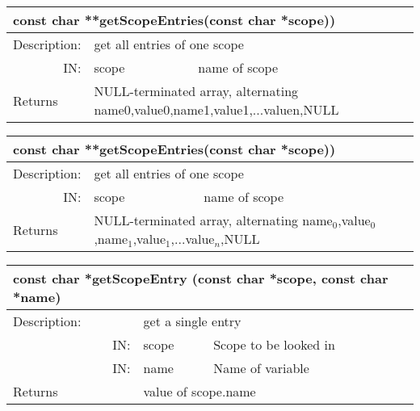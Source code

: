 \begin{htmlonly}  
\begin{longtable}{|p{4cm}|p{2.5cm}|p{7cm}|}
\hline
\multicolumn{3}{|p{13.5cm}|}{\bf const char **getScopeEntries(const char *scope))} \\
\hline
{Description:}   
              & \multicolumn{2}{|p{9.5cm}|}{get all entries of one scope} \\                     
\hline
\multicolumn{1}{|r|}{IN:} & {scope} 
                             & {name of scope}\\
\hline
{Returns}  
    & \multicolumn{2}{|p{9.5cm}|}{NULL-terminated array, alternating\newline
                                 name0,value0,name1,value1,...valuen,NULL} \endhead
\hline
\end{longtable}  
\end{htmlonly}

\latexonly  
\begin{longtable}{|p{4cm}|p{2.5cm}|p{7cm}|}
\hline
\multicolumn{3}{|p{13.5cm}|}{\bf const char **getScopeEntries(const char *scope))} \\
\hline
{Description:}   
              & \multicolumn{2}{|p{9.5cm}|}{get all entries of one scope} \\                     
\hline
\multicolumn{1}{|r|}{IN:} & {scope} 
                             & {name of scope}\\
\hline
{Returns}  
    & \multicolumn{2}{|p{9.5cm}|}{NULL-terminated array, alternating\newline
                               name$_0$,value$_0$,name$_1$,value$_1$,...value$_n$,NULL} \endhead
\hline
\end{longtable}  
\endlatexonly  
{}
  
\begin{longtable}{|p{4cm}|p{2.5cm}|p{7cm}|}
\hline
\multicolumn{3}{|p{13.5cm}|}{\bf const char *getScopeEntry (const char *scope, const char *name)}\\
\hline
{Description:}   
              & \multicolumn{2}{|p{9.5cm}|}{get a single entry} \\                     
\hline
\multicolumn{1}{|r|}{IN:} & {scope} 
                             & {Scope to be looked in}\\
\hline
\multicolumn{1}{|r|}{IN:} & {name} 
                             & {Name of variable}\\
\hline
{Returns}  
                        & \multicolumn{2}{|p{9.5cm}|}{value of scope.name} \endhead
\hline
\end{longtable}  
  
